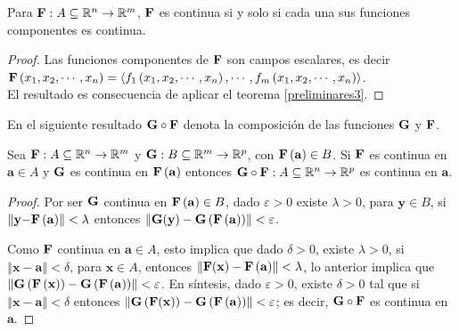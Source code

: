 \begin{teorema}\label{preliminares6} Para $\mathbf{F}:A \subseteq\mathbb{R}^{n}\rightarrow \mathbb{R}^{m}$,
  $\mathbf{F}$ es continua si y solo si cada una sus funciones componentes es continua.
\end{teorema}

\begin{proof}
  Las funciones componentes de $\mathbf{F}$ son campos escalares, es decir
  {\small $\mathbf{F}\left( x_{1},x_{2},\cdots ,x_{n}\right) =\left\langle f_{1}\left(x_{1},x_{2},\cdots ,x_{n}\right) ,\cdots ,f_{m}\left( x_{1},x_{2},\cdots ,x_{n}\right)\right\rangle$.} \\
  El resultado es consecuencia de aplicar el teorema \ref{preliminares3}.
\end{proof}

En el siguiente resultado $\mathbf{G}\circ \mathbf{F}$ denota la composición de las funciones $\mathbf{G}$ y $\mathbf{F}$.

\begin{teorema}
  \normalfont Sea $\mathbf{F}:A\subseteq \mathbb{R}^n\to \mathbb{R}^m$ y
  $\mathbf{G}:B\subseteq \mathbb{R}^m\to \mathbb{R}^p$, con
  $\mathbf{F}\left( \mathbf{a}\right) \in B$. Si $\mathbf{F}$ es continua en
  $\mathbf{a}\in A$ y $\mathbf{G}$ es continua en $\mathbf{F}\left( \mathbf{a}\right) $
  entonces $\mathbf{G}\circ \mathbf{F}:A\subseteq \mathbb{R}^n\to \mathbb{R}^p$ es continua en $\mathbf{a}${\normalfont.}
\end{teorema}

\begin{proof}
  Por ser $\mathbf{G}$ continua en $\mathbf{F}\left( \mathbf{a}\right) \in B$, dado $\varepsilon >0$
  existe $\lambda >0$, para $\mathbf{y} \in B$, si $\left\Vert \mathbf{y-}\mathbf{F}\left( \mathbf{a}\right)
  \right\Vert <\lambda $ entonces $\left\Vert \mathbf{G}(\mathbf{y})-\mathbf{G}\left( \mathbf{F}\left( \mathbf{a}\right) \right) \right\Vert <\varepsilon $.

  Como $\mathbf{F}$ continua en $\mathbf{a}\in A$, esto implica que dado
  $\delta >0$, existe $\lambda >0$,  si $\left\Vert \mathbf{x-a}\right\Vert <\delta $, para $\mathbf{x}\in A$,
  entonces $\left\Vert \mathbf{F}(\mathbf{x}) -\mathbf{F}\left( \mathbf{a}\right) \right\Vert <\lambda $,
  lo anterior implica que
  $\left\Vert \mathbf{G}\left( \mathbf{F}\left( \mathbf{x} \right) \right) -\mathbf{G}\left( \mathbf{F}\left(
  \mathbf{a}\right) \right) \right\Vert <\varepsilon $.
  En síntesis, dado $\varepsilon >0$, existe $\delta >0$ tal que si
  $\left\Vert \mathbf{x-a}\right\Vert <\delta $ entonces
  $\left\Vert \mathbf{G} \left( \mathbf{F}(\mathbf{x}) \right) -\mathbf{G}\left( \mathbf{F}\left( \mathbf{a}\right) \right)
  \right\Vert <\varepsilon$; es decir, $\mathbf{G}\circ \mathbf{F}$ es continua en $\mathbf{a}$.
\end{proof}

